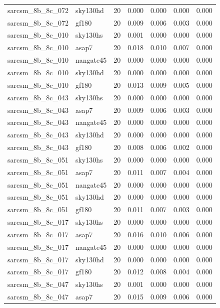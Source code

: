 \begin{tabular}{llrrrrr}
sarcsm\_8b\_8c\_072 & sky130hd & 20 & 0.000 & 0.000 & 0.000 & 0.000 \\
sarcsm\_8b\_8c\_072 & gf180 & 20 & 0.009 & 0.006 & 0.003 & 0.000 \\
sarcsm\_8b\_8c\_010 & sky130hs & 20 & 0.001 & 0.000 & 0.000 & 0.000 \\
sarcsm\_8b\_8c\_010 & asap7 & 20 & 0.018 & 0.010 & 0.007 & 0.000 \\
sarcsm\_8b\_8c\_010 & nangate45 & 20 & 0.000 & 0.000 & 0.000 & 0.000 \\
sarcsm\_8b\_8c\_010 & sky130hd & 20 & 0.000 & 0.000 & 0.000 & 0.000 \\
sarcsm\_8b\_8c\_010 & gf180 & 20 & 0.013 & 0.009 & 0.005 & 0.000 \\
sarcsm\_8b\_8c\_043 & sky130hs & 20 & 0.000 & 0.000 & 0.000 & 0.000 \\
sarcsm\_8b\_8c\_043 & asap7 & 20 & 0.009 & 0.006 & 0.003 & 0.000 \\
sarcsm\_8b\_8c\_043 & nangate45 & 20 & 0.000 & 0.000 & 0.000 & 0.000 \\
sarcsm\_8b\_8c\_043 & sky130hd & 20 & 0.000 & 0.000 & 0.000 & 0.000 \\
sarcsm\_8b\_8c\_043 & gf180 & 20 & 0.008 & 0.006 & 0.002 & 0.000 \\
sarcsm\_8b\_8c\_051 & sky130hs & 20 & 0.000 & 0.000 & 0.000 & 0.000 \\
sarcsm\_8b\_8c\_051 & asap7 & 20 & 0.011 & 0.007 & 0.004 & 0.000 \\
sarcsm\_8b\_8c\_051 & nangate45 & 20 & 0.000 & 0.000 & 0.000 & 0.000 \\
sarcsm\_8b\_8c\_051 & sky130hd & 20 & 0.000 & 0.000 & 0.000 & 0.000 \\
sarcsm\_8b\_8c\_051 & gf180 & 20 & 0.011 & 0.007 & 0.003 & 0.000 \\
sarcsm\_8b\_8c\_017 & sky130hs & 20 & 0.000 & 0.000 & 0.000 & 0.000 \\
sarcsm\_8b\_8c\_017 & asap7 & 20 & 0.016 & 0.010 & 0.006 & 0.000 \\
sarcsm\_8b\_8c\_017 & nangate45 & 20 & 0.000 & 0.000 & 0.000 & 0.000 \\
sarcsm\_8b\_8c\_017 & sky130hd & 20 & 0.000 & 0.000 & 0.000 & 0.000 \\
sarcsm\_8b\_8c\_017 & gf180 & 20 & 0.012 & 0.008 & 0.004 & 0.000 \\
sarcsm\_8b\_8c\_047 & sky130hs & 20 & 0.001 & 0.000 & 0.000 & 0.000 \\
sarcsm\_8b\_8c\_047 & asap7 & 20 & 0.015 & 0.009 & 0.006 & 0.000 \\

\end{tabular}
